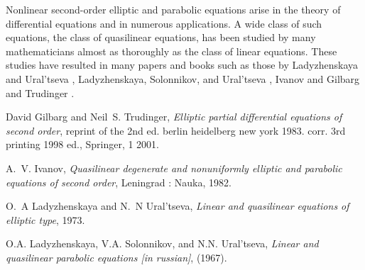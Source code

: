 \documentclass{article}
\begin{document}
Nonlinear second-order elliptic and parabolic equations arise in the theory of differential equations and in numerous applications. A wide class of such equations, the class of quasilinear equations, has been studied by many mathematicians almost as thoroughly as the class of linear equations. These studies have resulted in many papers and books such as those by Ladyzhenskaya and Ural'tseva \cite{ladyzhenskaya1973linear}, Ladyzhenskaya, Solonnikov, and Ural'tseva \cite{ladyzhenskaya1967linear}, Ivanov \cite{ivanov1982quasi} and Gilbarg and Trudinger \cite{GilbargTrudinger200101}.



\begin{thebibliography}{1}
David Gilbarg and Neil~S. Trudinger, \emph{Elliptic partial differential equations of second order}, reprint of the 2nd ed. berlin heidelberg new york 1983. corr. 3rd printing 1998 ed., Springer, 1 2001.

A.~V. Ivanov, \emph{Quasilinear degenerate and nonuniformly elliptic and parabolic equations of second order}, Leningrad : Nauka, 1982.

O.~A Ladyzhenskaya and N.~N Ural'tseva, \emph{Linear and quasilinear equations of elliptic type}, 1973.

O.A. Ladyzhenskaya, V.A. Solonnikov, and N.N. Ural'tseva, \emph{Linear and quasilinear parabolic equations [in russian]},  (1967).

\end{thebibliography}
\end{document}
